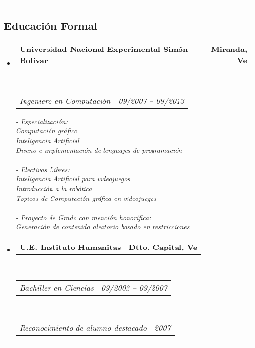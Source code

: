 \documentclass[10pt,letterpaper]{article}
\makeatletter
\newcommand{\headerrow}[2]
{\begin{tabular*}{\linewidth}{l@{\extracolsep{\fill}}r}
	#1 &
	#2 \\
\end{tabular*}}
\makeatother
\begin{document}

\hrule

\vspace{-0.4em}
\subsection*{Educación Formal}

\begin{itemize}
	\parskip=0.1em

\item 
   \headerrow
   {\textbf{Universidad Nacional Experimental Simón Bolívar}}
   {\textbf{Miranda, Ve}}
	\\
	\headerrow
   {\emph{Ingeniero en Computación}}
   {\emph{09/2007 -- 09/2013}}
   
   
   {\emph{- Especialización:}}
   \\
   {\emph{     Computación gráfica}}
   \\
   {\emph{     Inteligencia Artificial}}
   \\
   {\emph{     Diseño e implementación de lenguajes de programación}}
   \\
   \\
   {\emph{- Electivas Libres:}}
   \\
   {\emph{     Inteligencia Artificial para videojuegos}}
   \\
   {\emph{     Introducción a la robótica}}
   \\
   {\emph{     Topicos de Computación gráfica en videojuegos}}
   \\
   \\
   {\emph{- Proyecto de Grado con mención honorífica:}}
   \\
   {\emph{     Generación de contenido aleatorio basado en restricciones}}

 \item 
   \headerrow
   {\textbf{U.E. Instituto Humanitas}}
   {\textbf{Dtto. Capital, Ve}}
	\\
	\headerrow
   {\emph{Bachiller en Ciencias}}
   {\emph{09/2002 -- 09/2007}}
	\\
	\headerrow
   {\emph{Reconocimiento de alumno destacado}}
   {\emph{2007}}
\end{itemize}

\hrule
\vspace{-0.4em}
\end{document}

